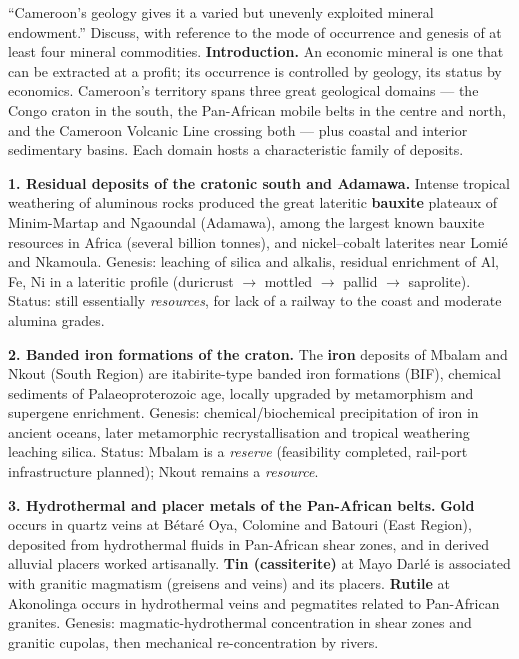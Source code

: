 \documentclass[11pt]{article}
\begin{document}
\begin{exoresolu}
``Cameroon's geology gives it a varied but unevenly exploited mineral endowment.'' Discuss, with reference to the mode of occurrence and genesis of at least four mineral commodities.
\tcblower
\textbf{Introduction.} An economic mineral is one that can be extracted at a profit; its occurrence is controlled by geology, its status by economics. Cameroon's territory spans three great geological domains — the Congo craton in the south, the Pan-African mobile belts in the centre and north, and the Cameroon Volcanic Line crossing both — plus coastal and interior sedimentary basins. Each domain hosts a characteristic family of deposits.

\textbf{1. Residual deposits of the cratonic south and Adamawa.} Intense tropical weathering of aluminous rocks produced the great lateritic \textbf{bauxite} plateaux of Minim-Martap and Ngaoundal (Adamawa), among the largest known bauxite resources in Africa (several billion tonnes), and nickel--cobalt laterites near Lomi\'e and Nkamoula. Genesis: leaching of silica and alkalis, residual enrichment of Al, Fe, Ni in a lateritic profile (duricrust $\rightarrow$ mottled $\rightarrow$ pallid $\rightarrow$ saprolite). Status: still essentially \emph{resources}, for lack of a railway to the coast and moderate alumina grades.

\textbf{2. Banded iron formations of the craton.} The \textbf{iron} deposits of Mbalam and Nkout (South Region) are itabirite-type banded iron formations (BIF), chemical sediments of Palaeoproterozoic age, locally upgraded by metamorphism and supergene enrichment. Genesis: chemical/biochemical precipitation of iron in ancient oceans, later metamorphic recrystallisation and tropical weathering leaching silica. Status: Mbalam is a \emph{reserve} (feasibility completed, rail-port infrastructure planned); Nkout remains a \emph{resource}.

\textbf{3. Hydrothermal and placer metals of the Pan-African belts.} \textbf{Gold} occurs in quartz veins at B\'etar\'e Oya, Colomine and Batouri (East Region), deposited from hydrothermal fluids in Pan-African shear zones, and in derived alluvial placers worked artisanally. \textbf{Tin (cassiterite)} at Mayo Darl\'e is associated with granitic magmatism (greisens and veins) and its placers. \textbf{Rutile} at Akonolinga occurs in hydrothermal veins and pegmatites related to Pan-African granites. Genesis: magmatic-hydrothermal concentration in shear zones and granitic cupolas, then mechanical re-concentration by rivers.


\end{exoresolu}
\end{document}
